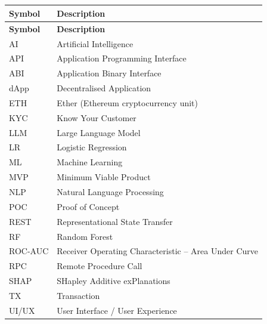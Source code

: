 
\begin{center}
\listoffigures
\end{center}

\newpage
{}
\begin{center}
\listoftables
\end{center}

\newpage
{}
\begin{center}
\section*{}
\end{center}

\begingroup
{}
\begin{longtable}{@{}p{}p{}@{}}
\textbf{Symbol} & \textbf{Description} \\[2mm]
\endfirsthead
\textbf{Symbol} & \textbf{Description} \\[2mm]
\endhead
AI & Artificial Intelligence \\
API & Application Programming Interface \\
ABI & Application Binary Interface \\
dApp & Decentralised Application \\
ETH & Ether (Ethereum cryptocurrency unit) \\
KYC & Know Your Customer \\
LLM & Large Language Model \\
LR & Logistic Regression \\
ML & Machine Learning \\
MVP & Minimum Viable Product \\
NLP & Natural Language Processing \\
POC & Proof of Concept \\
REST & Representational State Transfer \\
RF & Random Forest \\
ROC-AUC & Receiver Operating Characteristic -- Area Under Curve \\
RPC & Remote Procedure Call \\
SHAP & SHapley Additive exPlanations \\
TX & Transaction \\
UI/UX & User Interface / User Experience \\
\end{longtable}
\endgroup

\newpage
{}

\renewcommand*\contentsname{\size\textbf{TABLE OF CONTENTS}}

\begin{center}
\tableofcontents
\end{center}

\restoregeometry
